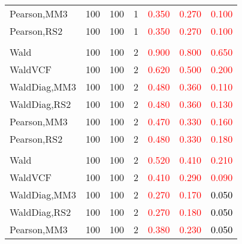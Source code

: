 \documentclass[
]{article}
\begin{document}
\begin{table}[H]
{\begin{tabular}[t]{lrrrrrr}
\hspace{1em}Pearson,MM3 & 100 & 100 & 1 & \textcolor{red}{0.350} & \textcolor{red}{0.270} & \textcolor{red}{0.100}\\
\hspace{1em}Pearson,RS2 & 100 & 100 & 1 & \textcolor{red}{0.350} & \textcolor{red}{0.270} & \textcolor{red}{0.100}\\
\addlinespace[0.3em]
\multicolumn{7}{l}{\textbf{1F 15V}}\\
\hspace{1em}Wald & 100 & 100 & 2 & \textcolor{red}{0.900} & \textcolor{red}{0.800} & \textcolor{red}{0.650}\\
\hspace{1em}WaldVCF & 100 & 100 & 2 & \textcolor{red}{0.620} & \textcolor{red}{0.500} & \textcolor{red}{0.200}\\
\hspace{1em}WaldDiag,MM3 & 100 & 100 & 2 & \textcolor{red}{0.480} & \textcolor{red}{0.360} & \textcolor{red}{0.110}\\
\hspace{1em}WaldDiag,RS2 & 100 & 100 & 2 & \textcolor{red}{0.480} & \textcolor{red}{0.360} & \textcolor{red}{0.130}\\
\hspace{1em}Pearson,MM3 & 100 & 100 & 2 & \textcolor{red}{0.470} & \textcolor{red}{0.330} & \textcolor{red}{0.160}\\
\hspace{1em}Pearson,RS2 & 100 & 100 & 2 & \textcolor{red}{0.480} & \textcolor{red}{0.330} & \textcolor{red}{0.180}\\
\addlinespace[0.3em]
\multicolumn{7}{l}{\textbf{2F 10V}}\\
\hspace{1em}Wald & 100 & 100 & 2 & \textcolor{red}{0.520} & \textcolor{red}{0.410} & \textcolor{red}{0.210}\\
\hspace{1em}WaldVCF & 100 & 100 & 2 & \textcolor{red}{0.410} & \textcolor{red}{0.290} & \textcolor{red}{0.090}\\
\hspace{1em}WaldDiag,MM3 & 100 & 100 & 2 & \textcolor{red}{0.270} & \textcolor{red}{0.170} & \textcolor{black}{0.050}\\
\hspace{1em}WaldDiag,RS2 & 100 & 100 & 2 & \textcolor{red}{0.270} & \textcolor{red}{0.180} & \textcolor{black}{0.050}\\
\hspace{1em}Pearson,MM3 & 100 & 100 & 2 & \textcolor{red}{0.380} & \textcolor{red}{0.230} & \textcolor{black}{0.050}\\

\end{tabular}}
\end{table}
\end{document}
